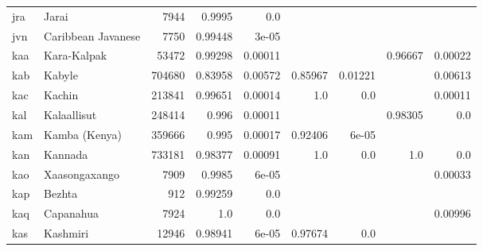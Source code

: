 \documentclass[11pt]{article}
\begin{document}
\begin{table*}[h]
{\begin{tabular}{llrrrrrrr}
jra         & Jarai         & 7944         & 0.9995         & 0.0         &          &          &          &          \\

jvn         & Caribbean Javanese         & 7750         & 0.99448         & 3e-05         &          &          &          &          \\

kaa         & Kara-Kalpak         & 53472         & 0.99298         & 0.00011         &          &          & 0.96667         & 0.00022         \\

kab         & Kabyle         & 704680         & 0.83958         & 0.00572         & 0.85967         & 0.01221         &          & 0.00613         \\

kac         & Kachin         & 213841         & 0.99651         & 0.00014         & 1.0         & 0.0         &          & 0.00011         \\

kal         & Kalaallisut         & 248414         & 0.996         & 0.00011         &          &          & 0.98305         & 0.0         \\

kam         & Kamba (Kenya)         & 359666         & 0.995         & 0.00017         & 0.92406         & 6e-05         &          &          \\

kan         & Kannada         & 733181         & 0.98377         & 0.00091         & 1.0         & 0.0         & 1.0         & 0.0         \\

kao         & Xaasongaxango         & 7909         & 0.9985         & 6e-05         &          &          &          & 0.00033         \\

kap         & Bezhta         & 912         & 0.99259         & 0.0         &          &          &          &          \\

kaq         & Capanahua         & 7924         & 1.0         & 0.0         &          &          &          & 0.00996         \\

kas         & Kashmiri         & 12946         & 0.98941         & 6e-05         & 0.97674         & 0.0         &          &          \\


\end{tabular}}
\end{table*}
\end{document}

